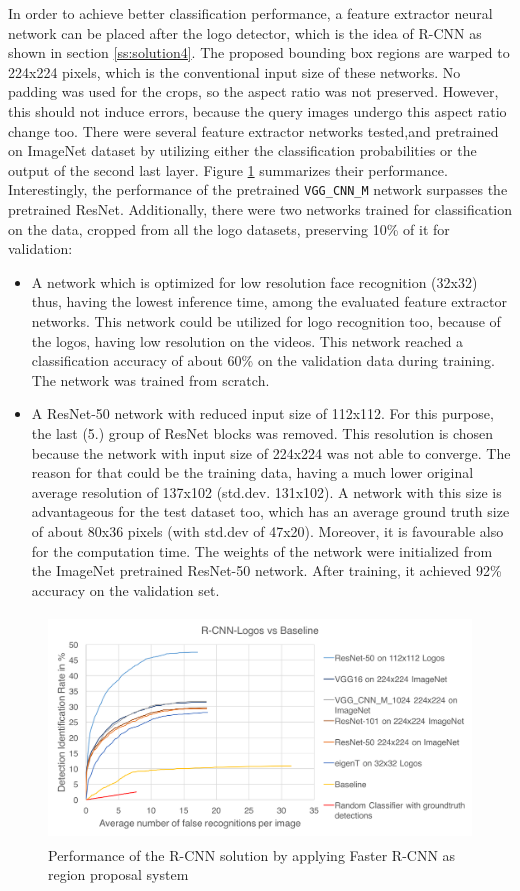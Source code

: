 In order to achieve better classification performance, a feature extractor neural network can be placed after the logo detector, which is the idea of R-CNN as shown in section \ref{ss:solution4}. The proposed bounding box regions are warped to 224x224 pixels, which is the conventional input size of these networks. No padding was used for the crops, so the aspect ratio was not preserved. However, this should not induce errors, because the query images undergo this aspect ratio change too. There were several feature extractor networks tested,and pretrained on ImageNet dataset by utilizing either the classification probabilities or the output of the second last layer. Figure \ref{f:sol4} summarizes their performance. Interestingly, the performance of the pretrained \texttt{VGG\_CNN\_M} network surpasses the pretrained ResNet. Additionally, there were two networks trained for classification on the data, cropped from all the logo datasets, preserving 10\% of it for validation:
\begin{itemize}
    \item A network \cite{ies_2016_herrmann_video_face_recognition} which is optimized for low resolution face recognition (32x32) thus, having the lowest inference time, among the evaluated feature extractor networks. This network could be utilized for logo recognition too, because of the logos, having low resolution on the videos. This network reached a classification accuracy of about 60\% on the validation data during training. The network was trained from scratch.
    \item A ResNet-50 network with reduced input size of 112x112. For this purpose, the last (5.) group of ResNet blocks was removed. This resolution is chosen because the network with input size of 224x224 was not able to converge. The reason for that could be the training data, having a much lower original average resolution of 137x102 (std.dev. 131x102). A network with this size is advantageous for the test dataset too, which has an average ground truth size of about 80x36 pixels (with std.dev of 47x20). Moreover, it is favourable also for the computation time. The weights of the network were initialized from the ImageNet pretrained ResNet-50 network. After training, it achieved 92\% accuracy on the validation set.
\end{itemize}
\begin{figure}
  \centering
  \includegraphics[height=60mm]{images/mt/sol4.png}
  \caption{Performance of the R-CNN solution by applying Faster R-CNN as region proposal system}
  \label{f:sol4}
\end{figure}


